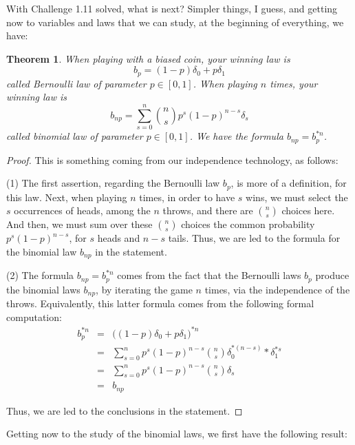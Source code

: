 \documentclass[12pt]{amsbook}
\newtheorem{theorem}{Theorem}[chapter]
\begin{document}
With Challenge 1.11 solved, what is next? Simpler things, I guess, and getting now to variables and laws that we can study, at the beginning of everything, we have:


\begin{theorem}
When playing with a biased coin, your winning law is
$$b_p=(1-p)\delta_0+p\delta_1$$
called Bernoulli law of parameter $p\in[0,1]$. When playing $n$ times, your winning law is
$$b_{np}=\sum_{s=0}^n\binom{n}{s}p^s(1-p)^{n-s}\delta_s$$
called binomial law of parameter $p\in[0,1]$. We have the formula $b_{np}=b_p^{*n}$.
\end{theorem}

\begin{proof}
This is something coming from our independence technology, as follows:

\medskip

(1) The first assertion, regarding the Bernoulli law $b_p$, is more of a definition, for this law. Next, when playing $n$ times, in order to have $s$ wins, we must select the $s$ occurrences of heads, among the $n$ throws, and there are $\binom{n}{s}$ choices here. And then, we must sum over these $\binom{n}{s}$ choices the common probability $p^s(1-p)^{n-s}$, for $s$ heads and $n-s$ tails. Thus, we are led to the formula for the binomial law $b_{np}$ in the statement.

\medskip

(2) The formula $b_{np}=b_p^{*n}$ comes from the fact that the Bernoulli laws $b_p$ produce the binomial laws $b_{np}$, by iterating the game $n$ times, via the independence of the throws. Equivalently, this latter formula comes from the following formal computation:
\begin{eqnarray*}
b_p^{*n}
&=&\big((1-p)\delta_0+p\delta_1\big)^{*n}\\
&=&\sum_{s=0}^np^s(1-p)^{n-s}\binom{n}{s}\delta_0^{*(n-s)}*\delta_1^{*s}\\
&=&\sum_{s=0}^np^s(1-p)^{n-s}\binom{n}{s}\delta_s\\
&=&b_{np}
\end{eqnarray*}

Thus, we are led to the conclusions in the statement.
\end{proof}

Getting now to the study of the binomial laws, we first have the following result:

\end{document}

